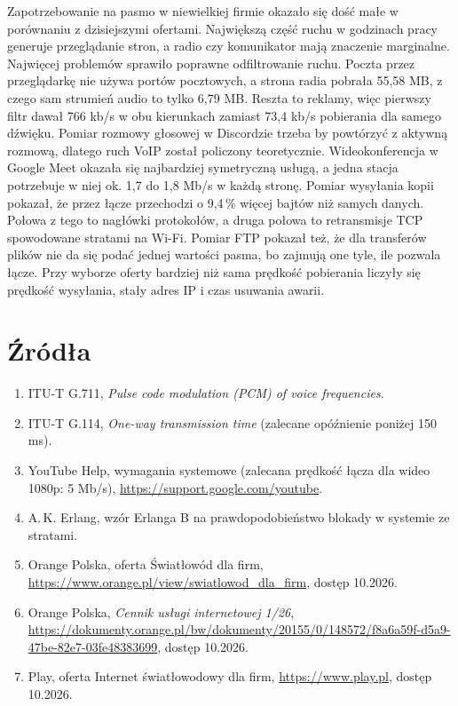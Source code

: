 \documentclass[12pt,a4paper]{article}
\begin{document}
Zapotrzebowanie na pasmo w niewielkiej firmie okazało się dość małe w porównaniu
z dzisiejszymi ofertami. Największą część ruchu w godzinach pracy generuje przeglądanie stron,
a radio czy komunikator mają znaczenie marginalne. Najwięcej problemów sprawiło poprawne
odfiltrowanie ruchu. Poczta przez przeglądarkę nie używa portów pocztowych, a strona radia
pobrała 55,58 MB, z czego sam strumień audio to tylko 6,79 MB. Reszta to reklamy, więc pierwszy
filtr dawał 766 kb/s w obu kierunkach zamiast 73,4 kb/s pobierania dla samego dźwięku. Pomiar rozmowy głosowej w Discordzie trzeba by powtórzyć z
aktywną rozmową, dlatego ruch VoIP został policzony teoretycznie. Wideokonferencja w Google Meet
okazała się najbardziej symetryczną usługą, a jedna stacja potrzebuje w niej ok. 1,7 do 1,8 Mb/s
w każdą stronę. Pomiar wysyłania kopii pokazał, że przez łącze przechodzi o 9,4\,\% więcej bajtów niż
samych danych. Połowa z tego to nagłówki protokołów, a druga połowa to retransmisje TCP
spowodowane stratami na Wi\nobreakdash-Fi. Pomiar FTP pokazał też,
że dla transferów plików nie da się podać jednej wartości pasma, bo zajmują one tyle, ile
pozwala łącze. Przy wyborze oferty bardziej niż sama prędkość pobierania liczyły się prędkość
wysyłania, stały adres IP i czas usuwania awarii.

\section*{Źródła}
\begin{enumerate}
\item ITU-T G.711, \emph{Pulse code modulation (PCM) of voice frequencies}.
\item ITU-T G.114, \emph{One-way transmission time} (zalecane opóźnienie poniżej 150 ms).
\item YouTube Help, wymagania systemowe (zalecana prędkość łącza dla wideo 1080p: 5 Mb/s),
\url{https://support.google.com/youtube}.
\item A.\,K. Erlang, wzór Erlanga B na prawdopodobieństwo blokady w systemie ze stratami.
\item Orange Polska, oferta Światłowód dla firm, \url{https://www.orange.pl/view/swiatlowod_dla_firm}, dostęp 10.2026.
\item Orange Polska, \emph{Cennik usługi internetowej 1/26},
\url{https://dokumenty.orange.pl/bw/dokumenty/20155/0/148572/f8a6a59f-d5a9-47be-82e7-03fe48383699}, dostęp 10.2026.
\item Play, oferta Internet światłowodowy dla firm, \url{https://www.play.pl}, dostęp 10.2026.
\end{enumerate}
\end{document}
